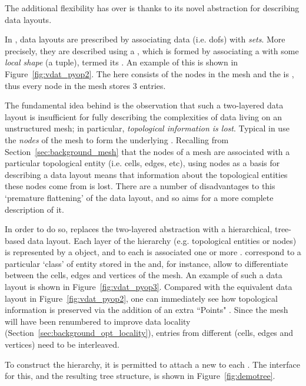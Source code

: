 The additional flexibility  has over  is thanks to its novel abstraction for describing data layouts.

In , data layouts are prescribed by associating data (i.e. \glspl{dof}) with \textit{sets}.
More precisely, they are described using a , which is formed by associating a  with some \textit{local shape} (a tuple), termed its .
An example of this is shown in Figure~\ref{fig:vdat_pyop2}.
The  here consists of the nodes in the mesh and the  is , thus every node in the mesh stores 3 entries.

The fundamental idea behind  is the observation that such a two-layered data layout is insufficient for fully describing the complexities of data living on an unstructured mesh; in particular, \textit{topological information is lost}.
Typical  in  use the \textit{nodes} of the mesh to form the underlying .
Recalling from Section~\ref{sec:background_mesh} that the nodes of a mesh are associated with a particular topological entity (i.e. cells, edges, etc), using nodes as a basis for describing a data layout means that information about the topological entities these nodes come from is lost.
There are a number of disadvantages to this `premature flattening' of the data layout, and so  aims for a more complete description of it.

In order to do so,  replaces the two-layered  abstraction with a hierarchical, tree-based data layout.
Each layer of the hierarchy (e.g. topological entities or nodes) is represented by a  object, and to each  is associated one or more .
 correspond to a particular `class' of entity stored in the  and, for instance, allow  to differentiate between the cells, edges and vertices of the mesh.
An example of such a data layout is shown in Figure~\ref{fig:vdat_pyop3}.
Compared with the equivalent  data layout in Figure~\ref{fig:vdat_pyop2}, one can immediately see how topological information is preserved via the addition of an extra ``Points" .
Since the mesh will have been renumbered to improve data locality (Section~\ref{sec:background_opt_locality}), entries from different  (cells, edges and vertices) need to be interleaved.

To construct the hierarchy, it is permitted to attach a new  to each .
The interface for this, and the resulting tree structure, is shown in Figure~\ref{fig:demotree}.

